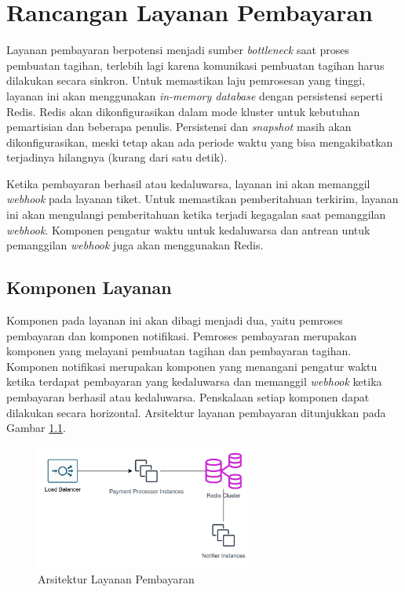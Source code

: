 \chapter{Rancangan Layanan Pembayaran}
\label{apx:payment-service}

Layanan pembayaran berpotensi menjadi sumber \textit{bottleneck} saat proses pembuatan tagihan, terlebih lagi karena komunikasi pembuatan tagihan harus dilakukan secara sinkron. Untuk memastikan laju pemrosesan yang tinggi, layanan ini akan menggunakan \textit{in-memory database} dengan persistensi seperti Redis. Redis akan dikonfigurasikan dalam mode kluster untuk kebutuhan pemartisian dan beberapa penulis. Persistensi dan \textit{snapshot} masih akan dikonfigurasikan, meski tetap akan ada periode waktu yang bisa mengakibatkan terjadinya hilangnya (kurang dari satu detik).

Ketika pembayaran berhasil atau kedaluwarsa, layanan ini akan memanggil \textit{webhook} pada layanan tiket. Untuk memastikan pemberitahuan terkirim, layanan ini akan mengulangi pemberitahuan ketika terjadi kegagalan saat pemanggilan \textit{webhook}. Komponen pengatur waktu untuk kedaluwarsa dan antrean untuk pemanggilan \textit{webhook} juga akan menggunakan Redis.

\section{Komponen Layanan}

Komponen pada layanan ini akan dibagi menjadi dua, yaitu pemroses pembayaran dan komponen notifikasi. Pemroses pembayaran merupakan komponen yang melayani pembuatan tagihan dan pembayaran tagihan. Komponen notifikasi merupakan komponen yang menangani pengatur waktu ketika terdapat pembayaran yang kedaluwarsa dan  memanggil \textit{webhook} ketika pembayaran berhasil atau kedaluwarsa. Penskalaan setiap komponen dapat dilakukan secara horizontal. Arsitektur layanan pembayaran ditunjukkan pada Gambar \ref{fig:payment-service-deployment}.

\pagebreak

\begin{figure}[htbp]
    \centering
    \includegraphics[width=0.65\textwidth]{resources/chapter-3/payment-service.png}
    \caption{Arsitektur Layanan Pembayaran}
    \label{fig:payment-service-deployment}
\end{figure}

